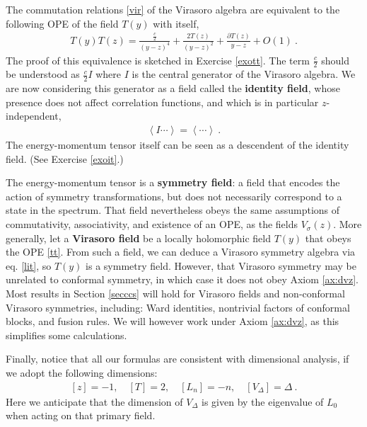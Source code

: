 \documentclass[12pt, a4paper, notitlepage, twoside]{report}
\numberwithin{equation}{section}
\theoremstyle{break}
\begin{document}
The commutation relations \eqref{vir} of the Virasoro algebra are equivalent to the following OPE of the field $T(y)$ with itself,
\begin{align}
 \boxed{T(y)T(z) = \frac{\frac{c}{2}}{(y-z)^4} + \frac{2T(z)}{(y-z)^2} + \frac{\partial T(z)}{y-z} + O(1)}\ .
\label{tt}
\end{align}
The proof of this equivalence is sketched in Exercise \ref{exott}. 
The term $\frac{c}{2}$ should be understood as $\frac{c}{2}I$ where $I$ is the
central generator of the Virasoro algebra.
We are now considering this generator as a field called the 
\textbf{\boldmath identity field}, whose presence does not affect correlation functions, and which is in particular $z$-independent,
\begin{align}
 \left\langle I \cdots \right\rangle = \left\langle \cdots \right\rangle \ .
\label{ivac}
\end{align}
The energy-momentum tensor itself can be seen as a descendent of the identity field. (See Exercise \ref{exoit}.)

The energy-momentum tensor is a \textbf{\boldmath symmetry field}: a field that encodes the action of symmetry transformations, but does not necessarily correspond to a state in the spectrum. 
That field nevertheless obeys the same assumptions of commutativity, associativity, and existence of an OPE, as the fields $V_\sigma(z)$.
More generally, let a \textbf{Virasoro field} be a locally holomorphic field $T(y)$ that obeys the OPE \eqref{tt}. 
From such a field, we can deduce a Virasoro symmetry algebra via eq. \eqref{lit}, so $T(y)$ is a symmetry field. However, that Virasoro symmetry may be unrelated to conformal symmetry, in which case it does not obey Axiom \ref{ax:dvz}. 
Most results in Section \ref{secccs} will hold for Virasoro fields and non-conformal Virasoro symmetries, including: Ward identities, nontrivial factors of conformal blocks, and fusion rules. We will however work under Axiom \ref{ax:dvz}, as this simplifies some calculations.

Finally, notice that all our formulas are consistent with dimensional analysis, if we adopt the following dimensions:
\begin{align}
 \boxed{[z]=-1,\quad [T]=2, \quad [L_n]=-n, \quad [V_\Delta]=\Delta}\ .
\label{zaz}
\end{align}
Here we anticipate that the dimension of $V_\Delta$ is given by the eigenvalue of $L_0$ when acting on that primary field.
\end{document}
